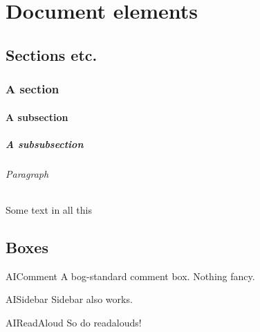 \documentclass[a4paper,twocolumn,openany,nodeprecatedcode]{astroinfernobook}
\begin{document}
\frontmatter

\begin{titlepage}
\end{titlepage}

\AIMakeElementTOCpage

\mainmatter

\part{Document elements}
\chapter{Sections etc.}
\section{A section}
\subsection{A subsection}
\subsubsection{A subsubsection}
\paragraph{Paragraph}
Some text in all this

\chapter{Boxes}
\begin{AIComment}{AIComment}
  A bog-standard comment box. Nothing fancy.
\end{AIComment}
\begin{AISidebar}{AISidebar}
  Sidebar also works.
\end{AISidebar}
\begin{AIReadAloud}{AIReadAloud}
  So do readalouds!
\end{AIReadAloud}
\end{document}
